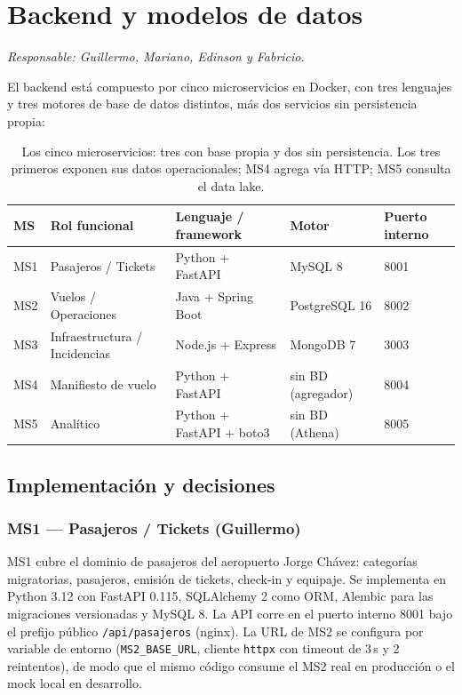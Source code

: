 \section{Backend y modelos de datos}
\label{sec:backend}
\textit{Responsable: Guillermo, Mariano, Edinson y Fabricio.}

El backend está compuesto por cinco microservicios en Docker, con tres
lenguajes y tres motores de base de datos distintos, más dos servicios
sin persistencia propia:

\begin{table}[htbp]
\centering\small
\begin{tabularx}{\textwidth}{p{}p{}p{}p{}X}
\toprule
MS & Rol funcional & Lenguaje / framework & Motor & Puerto interno \\
\midrule
MS1 & Pasajeros / Tickets & Python + FastAPI & MySQL 8 & 8001 \\
MS2 & Vuelos / Operaciones & Java + Spring Boot & PostgreSQL 16 & 8002 \\
MS3 & Infraestructura / Incidencias & Node.js + Express & MongoDB 7 & 3003 \\
MS4 & Manifiesto de vuelo & Python + FastAPI & sin BD (agregador) & 8004 \\
MS5 & Analítico & Python + FastAPI + boto3 & sin BD (Athena) & 8005 \\
\bottomrule
\end{tabularx}
\caption{Los cinco microservicios: tres con base propia y dos sin
persistencia. Los tres primeros exponen sus datos operacionales; MS4
agrega vía HTTP; MS5 consulta el data lake.}
\label{tab:ms-backend}
\end{table}

\subsection{Implementación y decisiones}

\subsubsection{MS1 --- Pasajeros / Tickets (Guillermo)}
MS1 cubre el dominio de pasajeros del aeropuerto Jorge Chávez: categorías
migratorias, pasajeros, emisión de tickets, check-in y equipaje. Se
implementa en Python 3.12 con FastAPI 0.115, SQLAlchemy 2 como ORM, Alembic
para las migraciones versionadas y MySQL 8. La API corre en el puerto
interno 8001 bajo el prefijo público \texttt{/api/pasajeros} (nginx). La
URL de MS2 se configura por variable de entorno
(\texttt{MS2\_BASE\_URL}, cliente \texttt{httpx} con timeout de 3\,s y 2
reintentos), de modo que el mismo código consume el MS2 real en producción
o el mock local en desarrollo.

